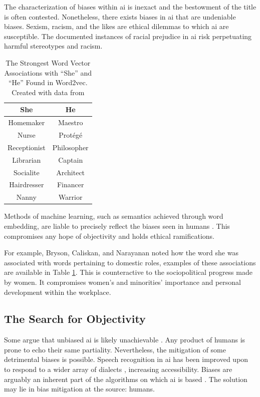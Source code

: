 \documentclass{report}
\begin{document}
The characterization of biases within \ac{ai} is inexact and the bestowment of the title is often contested. 
Nonetheless, there exists biases in \ac{ai} that are undeniable biases. Sexism, racism, and the likes are ethical dilemmas to which \ac{ai} are susceptible. 
The documented instances of racial prejudice in \ac{ai} \citep{danks2017} risk perpetuating harmful stereotypes and racism. 

\begin{table}[h]
	\centering
	\begin{tabular}{ c | c }
	\textbf{She} &  \textbf{He} \\ \hline
	Homemaker & Maestro \\
	Nurse & Prot\'eg\'e \\
	Receptionist & Philosopher \\
	Librarian & Captain \\
	Socialite & Architect  \\
	Hairdresser & Financer \\
	Nanny & Warrior \\
	\end{tabular}
	\caption[Word Vector Associations with ``She'' and ``He'']{
	The Strongest Word Vector Associations with ``She'' and ``He'' Found in Word2vec\protect\footnotemark. 
	Created with data from \protect\cite{bolukbasi2016}}
	\label{tbl:wordvec}
\end{table}


Methods of machine learning, such as semantics achieved through word embedding\footnotemark , are liable to precisely reflect the biases seen in humans \citep{caliskan2017}. 
This compromises any hope of objectivity and holds ethical ramifications. 

For example, Bryson, Caliskan, and Narayanan noted how the word she was associated with words pertaining to domestic roles, examples of these associations are available in Table \ref{tbl:wordvec}. 
This is counteractive to the sociopolitical progress made by women. 
It compromises women’s and minorities’ importance and personal development within the workplace. 

\subsection{The Search for Objectivity}
Some argue that unbiased \ac{ai} is likely unachievable \citep{bozdag2013}. 
Any product of humans is prone to echo their same partiality. 
Nevertheless, the mitigation of some detrimental biases is possible. 
Speech recognition in \ac{ai} has been improved upon to respond to a wider array of dialects \citep{hirayama2015}, increasing accessibility. Biases are arguably an inherent part of the algorithms on which \ac{ai} is based \citep{danks2017}. 
The solution may lie in bias mitigation at the source: humans.
\end{document}
